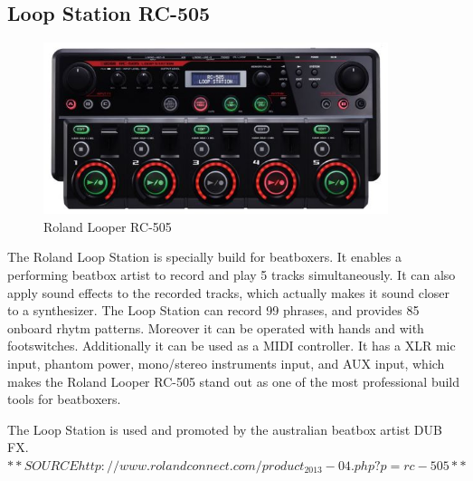 \subsection{ Loop Station RC-505 }
\begin{figure}[h]
	\begin{center}
		\includegraphics[height=5cm]{fig/Roland-RC-505.JPG}
		\caption{Roland Looper RC-505}
		\label{Looper}
	\end{center}
\end{figure}
The Roland Loop Station is specially build for beatboxers. It enables a performing beatbox artist to record and play 5 tracks simultaneously. It can also apply sound effects to the recorded tracks, which actually makes it sound closer to a synthesizer. The Loop Station can record 99 phrases, and provides 85 onboard rhytm patterns. Moreover it can be operated with hands and with footswitches. Additionally it can be used as a MIDI controller. It has a XLR mic input, phantom power, mono/stereo instruments input, and AUX input, which makes the Roland Looper RC-505 stand out as one of the most professional build tools for beatboxers.

The Loop Station is used and promoted by the australian beatbox artist DUB FX.$**SOURCE http://www.rolandconnect.com/product_2013-04.php?p=rc-505 **$


